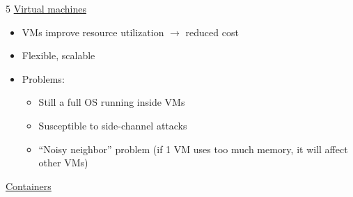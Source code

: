 \documentclass[landscape,a4paper]{extarticle}
\begin{document}
\begin{multicols*}{5}
    \uline{Virtual machines}
    
    \begin{itemize}
        \item VMs improve resource utilization $\rightarrow$ reduced cost
        \item Flexible, scalable
        \item Problems:
        \begin{itemize}
            \item Still a full OS running inside VMs
            \item Susceptible to side-channel attacks
            \item ``Noisy neighbor'' problem (if 1 VM uses too much memory, it will affect other VMs)
        \end{itemize}
    \end{itemize}

    \uline{Containers}
    

\end{multicols*}
\end{document}
